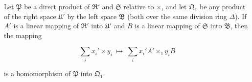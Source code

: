 Let $\mathfrak{P}$ be a direct product of $\mathfrak{R}'$ and $\mathfrak{S}$ relative to $\times$, and let $\mathfrak{Q}_1$ be any product of the right space $\mathfrak{U}'$ by the left space $\mathfrak{B}$ (both over the same division ring $\Delta$). If $A'$ is a linear mapping of $\mathfrak{R}'$ into $\mathfrak{U}'$ and $B$ is a linear mapping of $\mathfrak{S}$ into $\mathfrak{B}$, then the mapping

$$\sum_i x_i' \times y_i \;\longmapsto\; \sum_i x_i' A' \times_1 y_i B$$

is a homomorphism of $\mathfrak{P}$ into $\mathfrak{Q}_1$.
